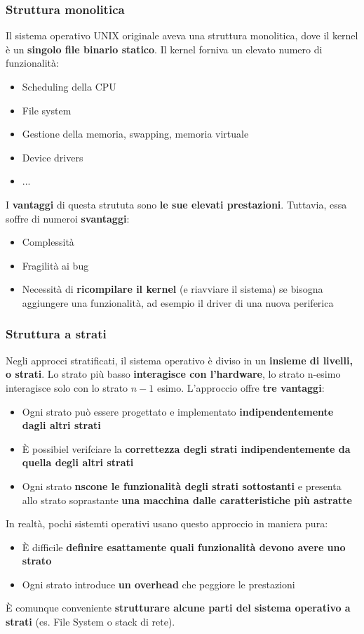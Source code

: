 \documentclass[12pt]{article}
\begin{document}
\subsubsection{Struttura monolitica}
Il sistema operativo UNIX originale aveva una struttura monolitica, dove il kernel è un \textbf{singolo file binario statico}.
Il kernel forniva un elevato numero di funzionalità:
\begin{itemize}
    \item Scheduling della CPU
    \item File system
    \item Gestione della memoria, swapping, memoria virtuale
    \item Device drivers
    \item ...
\end{itemize}
I \textbf{vantaggi} di questa strututa sono \textbf{le sue elevati prestazioni}.
Tuttavia, essa soffre di numeroi \textbf{svantaggi}:
\begin{itemize}
    \item Complessità 
    \item Fragilità ai bug
    \item Necessità di \textbf{ricompilare il kernel} (e riavviare il sistema) se bisogna aggiungere una funzionalità, ad esempio il driver di una nuova periferica
\end{itemize}
\subsubsection{Struttura a strati}
Negli approcci stratificati, il sistema operativo è diviso in un \textbf{insieme di livelli, o strati}.
Lo strato più basso \textbf{interagisce con l'hardware}, lo strato n-esimo interagisce solo con lo strato $n-1$ esimo.
L'approccio offre \textbf{tre vantaggi}:
\begin{itemize}
    \item Ogni strato può essere progettato e implementato \textbf{indipendentemente dagli altri strati}
    \item È possibiel verifciare la \textbf{correttezza degli strati indipendentemente da quella degli altri strati}
    \item Ogni strato \textbf{nscone le funzionalità degli strati sottostanti} e presenta allo strato soprastante \textbf{una macchina dalle caratteristiche più astratte}
\end{itemize}
In realtà, pochi sistemti operativi usano questo approccio in maniera pura:
\begin{itemize}
    \item È difficile \textbf{definire esattamente quali funzionalità devono avere uno strato}
    \item Ogni strato introduce \textbf{un overhead} che peggiore le prestazioni
\end{itemize}
È comunque conveniente \textbf{strutturare alcune parti del sistema operativo a strati} (es. File System o stack di rete).
\end{document}
